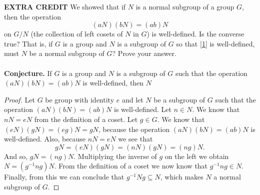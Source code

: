 \documentclass[11pt]{article}
\begin{document}
{\bf EXTRA CREDIT} We showed that if $N$ is a normal subgroup of a group $G$, then the operation
\begin{equation}\label{1}
(aN)(bN) = (ab)N
\end{equation}
on $G/N$ (the collection of left cosets of $N$ in $G$) is well-defined. Is the converse true? That is, if $G$ is a group and $N$ is a subgroup of $G$ so that \eqref{1} is well-defined, must $N$ be a normal subgroup of $G$? Prove your answer.\\
~\\
{\bf Conjecture.} If $G$ is a group and $N$ is a subgroup of $G$ such that the operation $(aN)(bN) = (ab)N$ is well-defined, then $N$
\begin{proof}
Let $G$ be group with identity $e$ and let $N$ be a subgroup of $G$ such that the operation $(aN)(bN) = (ab)N$ is well-defined. Let $n\in N$. We know that $nN = eN$ from the definition of a coset. Let $g\in G$. We know that $(eN)(gN) = (eg)N = gN$, because the operation $(aN)(bN) = (ab)N$ is well-defined. Also, because $nN = eN$ we see that 
\[gN = (eN)(gN) = (nN)(gN) = (ng)N.\]
And so, $gN = (ng)N$. Multiplying the inverse of $g$ on the left we obtain $N = (g^{-1}ng)N$. From the definition of a coset we now know that $g^{-1}ng \in N$. Finally, from this we can conclude that $g^{-1}Ng \subseteq N$, which makes $N$ a normal subgroup of $G$.
\end{proof}
\end{document}
